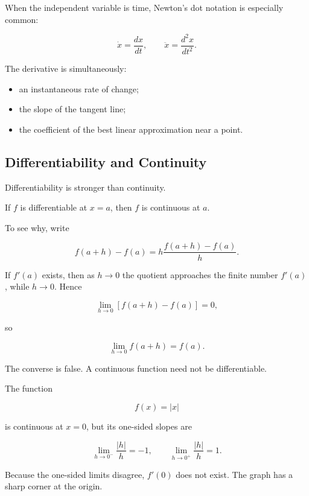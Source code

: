 When the independent variable is time, Newton's dot notation is especially common:

\[
\dot x=\frac{dx}{dt},
\qquad
\ddot x=\frac{d^2x}{dt^2}.
\]

\begin{bookprinciple}
The derivative is simultaneously:

\begin{itemize}
\item an instantaneous rate of change;
\item the slope of the tangent line;
\item the coefficient of the best linear approximation near a point.
\end{itemize}
\end{bookprinciple}

\subsection{Differentiability and Continuity}

Differentiability is stronger than continuity.

\begin{bookproperty}
If $f$ is differentiable at $x=a$, then $f$ is continuous at $a$.
\end{bookproperty}

To see why, write

\[
f(a+h)-f(a)
=
h\frac{f(a+h)-f(a)}{h}.
\]

If $f'(a)$ exists, then as $h\to0$ the quotient approaches the finite number $f'(a)$, while $h\to0$. Hence

\[
\lim_{h\to0}[f(a+h)-f(a)]=0,
\]

so

\[
\lim_{h\to0}f(a+h)=f(a).
\]

The converse is false. A continuous function need not be differentiable.

\begin{bookexample}[A Corner]
The function

\[
f(x)=|x|
\]

is continuous at $x=0$, but its one-sided slopes are

\[
\lim_{h\to0^-}\frac{|h|}{h}=-1,
\qquad
\lim_{h\to0^+}\frac{|h|}{h}=1.
\]

Because the one-sided limits disagree, $f'(0)$ does not exist. The graph has a sharp corner at the origin.
\end{bookexample}

